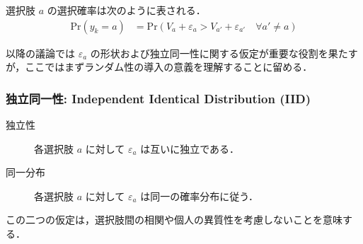 選択肢 $a$ の選択確率は次のように表される．
\begin{equation}
  \begin{aligned}
    \text{Pr}(y_k = a) &= \text{Pr}\left( V_a + \varepsilon_a > V_{a'} + \varepsilon_{a'} \quad \forall a' \neq a \right)
  \end{aligned}
\end{equation}

以降の議論では $\varepsilon_a$ の形状および独立同一性に関する仮定が重要な役割を果たすが，ここではまずランダム性の導入の意義を理解することに留める．

\subsubsection{独立同一性: Independent Identical Distribution (IID)}
\begin{description}
  \item[独立性] 各選択肢 $a$ に対して $\varepsilon_a$ は互いに独立である．
  \item[同一分布] 各選択肢 $a$ に対して $\varepsilon_a$ は同一の確率分布に従う．
\end{description}
この二つの仮定は，選択肢間の相関や個人の異質性を考慮しないことを意味する．








